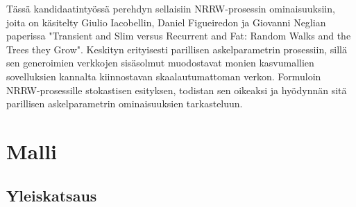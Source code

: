 \documentclass[finnish, 12pt, a4paper, sci, utf8, pdfa]{aaltothesis}
\begin{document}
Tässä kandidaatintyössä perehdyn sellaisiin NRRW-prosessin ominaisuuksiin, joita on käsitelty Giulio Iacobellin, Daniel Figueiredon ja Giovanni Neglian paperissa "Transient and Slim 
versus Recurrent and Fat: Random Walks and the Trees they Grow". Keskityn erityisesti parillisen askelparametrin prosessiin, sillä sen generoimien verkkojen sisäsolmut muodostavat 
monien kasvumallien sovelluksien kannalta kiinnostavan skaalautumattoman verkon. Formuloin NRRW-prosessille stokastisen esityksen, todistan sen oikeaksi ja hyödynnän sitä parillisen askelparametrin ominaisuuksien tarkasteluun.

\clearpage

\section{Malli}

\subsection{Yleiskatsaus}
\end{document}
